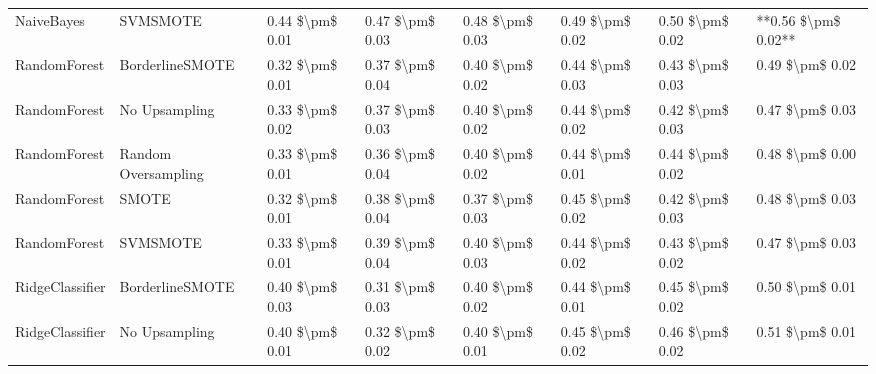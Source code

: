 \begin{tabular}{llllllll}
                     NaiveBayes &                      SVMSMOTE & 0.44 \$\textbackslash pm\$ 0.01 &           0.47 \$\textbackslash pm\$ 0.03 &       0.48 \$\textbackslash pm\$ 0.03 &        0.49 \$\textbackslash pm\$ 0.02 &                         0.50 \$\textbackslash pm\$ 0.02 & **0.56 \$\textbackslash pm\$ 0.02** \\
                   RandomForest &               BorderlineSMOTE & 0.32 \$\textbackslash pm\$ 0.01 &           0.37 \$\textbackslash pm\$ 0.04 &       0.40 \$\textbackslash pm\$ 0.02 &        0.44 \$\textbackslash pm\$ 0.03 &                         0.43 \$\textbackslash pm\$ 0.03 &     0.49 \$\textbackslash pm\$ 0.02 \\
                   RandomForest &                 No Upsampling & 0.33 \$\textbackslash pm\$ 0.02 &           0.37 \$\textbackslash pm\$ 0.03 &       0.40 \$\textbackslash pm\$ 0.02 &        0.44 \$\textbackslash pm\$ 0.02 &                         0.42 \$\textbackslash pm\$ 0.03 &     0.47 \$\textbackslash pm\$ 0.03 \\
                   RandomForest &           Random Oversampling & 0.33 \$\textbackslash pm\$ 0.01 &           0.36 \$\textbackslash pm\$ 0.04 &       0.40 \$\textbackslash pm\$ 0.02 &        0.44 \$\textbackslash pm\$ 0.01 &                         0.44 \$\textbackslash pm\$ 0.02 &     0.48 \$\textbackslash pm\$ 0.00 \\
                   RandomForest &                         SMOTE & 0.32 \$\textbackslash pm\$ 0.01 &           0.38 \$\textbackslash pm\$ 0.04 &       0.37 \$\textbackslash pm\$ 0.03 &        0.45 \$\textbackslash pm\$ 0.02 &                         0.42 \$\textbackslash pm\$ 0.03 &     0.48 \$\textbackslash pm\$ 0.03 \\
                   RandomForest &                      SVMSMOTE & 0.33 \$\textbackslash pm\$ 0.01 &           0.39 \$\textbackslash pm\$ 0.04 &       0.40 \$\textbackslash pm\$ 0.03 &        0.44 \$\textbackslash pm\$ 0.02 &                         0.43 \$\textbackslash pm\$ 0.02 &     0.47 \$\textbackslash pm\$ 0.03 \\
                RidgeClassifier &               BorderlineSMOTE & 0.40 \$\textbackslash pm\$ 0.03 &           0.31 \$\textbackslash pm\$ 0.03 &       0.40 \$\textbackslash pm\$ 0.02 &        0.44 \$\textbackslash pm\$ 0.01 &                         0.45 \$\textbackslash pm\$ 0.02 &     0.50 \$\textbackslash pm\$ 0.01 \\
                RidgeClassifier &                 No Upsampling & 0.40 \$\textbackslash pm\$ 0.01 &           0.32 \$\textbackslash pm\$ 0.02 &       0.40 \$\textbackslash pm\$ 0.01 &        0.45 \$\textbackslash pm\$ 0.02 &                         0.46 \$\textbackslash pm\$ 0.02 &     0.51 \$\textbackslash pm\$ 0.01 \\

\end{tabular}
